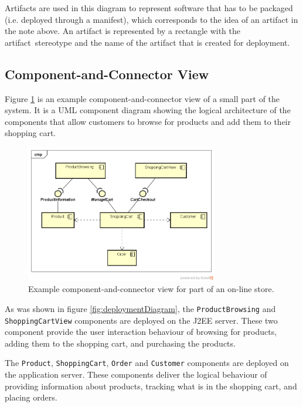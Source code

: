 Artifacts are used in this diagram to represent software that has to be packaged
(i.e. deployed through a manifest), which corresponds to the idea of an artifact in the note above.
An artifact is represented by a rectangle with the \guillemotleft artifact\guillemotright~stereotype and the name of the artifact that is created for deployment.

\subsection{Component-and-Connector View}
Figure \ref{fig:componentDiagram} is an example component-and-connector view of a small part of the system.
It is a UML component diagram showing the logical architecture of the components that allow customers to browse for products and add them to their shopping cart.

\begin{figure}[h]
    \centering
    \includegraphics[trim=37 48 18 50,clip,width=0.75\textwidth]{images/component_diagram.png}
    \caption{Example component-and-connector view for part of an on-line store.}
    \label{fig:componentDiagram}
\end{figure}

\noindent
As was shown in figure \ref{fig:deploymentDiagram}, the \texttt{ProductBrowsing} and \texttt{ShoppingCartView} components are deployed on the J2EE server.
These two component provide the user interaction behaviour of browsing for products, adding them to the shopping cart, and purchasing the products.

The \texttt{Product}, \texttt{ShoppingCart}, \texttt{Order} and \texttt{Customer} components are deployed on the application server.
These components deliver the logical behaviour of providing information about products, tracking what is in the shopping cart, and placing orders.

